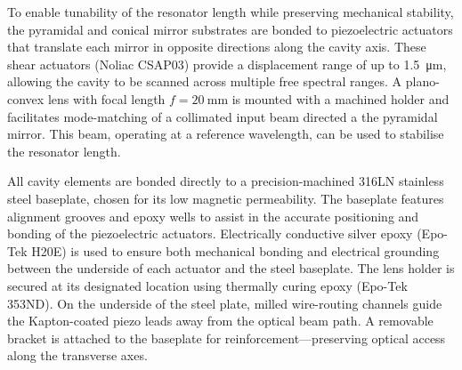\documentclass[../Thesis-IJspeert.tex]{subfiles}
\begin{document}
To enable tunability of the resonator length while preserving mechanical stability, the pyramidal and conical mirror substrates are bonded to piezoelectric actuators that translate each mirror in opposite directions along the cavity axis. These shear actuators (Noliac CSAP03) provide a displacement range of up to \SI{1.5}{\micro\metre}, allowing the cavity to be scanned across multiple free spectral ranges. A plano-convex lens with focal length $f = \SI{20}{\milli\metre}$ is mounted with a machined holder and facilitates mode-matching of a collimated input beam directed a the pyramidal mirror. This beam, operating at a reference wavelength, can be used to stabilise the resonator length.

All cavity elements are bonded directly to a precision-machined 316LN stainless steel baseplate, chosen for its low magnetic permeability. The baseplate features alignment grooves and epoxy wells to assist in the accurate positioning and bonding of the piezoelectric actuators. Electrically conductive silver epoxy (Epo-Tek H20E) is used to ensure both mechanical bonding and electrical grounding between the underside of each actuator and the steel baseplate. The lens holder is secured at its designated location using thermally curing epoxy (Epo-Tek 353ND). On the underside of the steel plate, milled wire-routing channels guide the Kapton-coated piezo leads away from the optical beam path. A removable bracket is attached to the baseplate for reinforcement---preserving optical access along the transverse axes.
\end{document}
